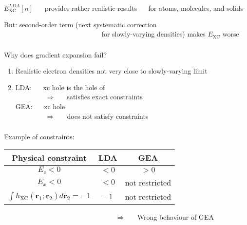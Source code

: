 \documentclass[compress]{beamer}
\begin{document}
\frame
{ 
  \frametitle{}
  \begin{small}
    {\scriptsize
      $E_{\mathrm{XC}}^{LDA}[n]$ $\quad $ provides rather realistic results $\quad $ for atoms, molecules, and solids

      \vspace{7mm}
      But: second-order term (\alert{next systematic correction} \\
      $\qquad \qquad \qquad \qquad \qquad \qquad \qquad $ for slowly-varying densities) \alert{makes} $E_{\mathrm{XC}}$ \alert{worse}
    }
  \end{small}
}

\frame
{ 
  \frametitle{}
  \begin{small}
    {\scriptsize
      Why does gradient expansion fail?
      \begin{enumerate}
        \item Realistic electron densities not very close to slowly-varying limit
        \item LDA: $\quad $ xc hole is the hole of  \\
          $\qquad \qquad $ $\Longrightarrow $ $\quad $ satisfies exact constraints \\
          GEA: $\quad $ xc hole  \\
          $\qquad \qquad $ $\Longrightarrow $ $\quad $ does not satisfy constraints
          
      \end{enumerate}
    }
  \end{small}
}

\frame
{ 
  \frametitle{}
  \begin{small}
    {\scriptsize
      Example of constraints:
      
      \begin{center}
        \begin{tabular}{c c c}
          Physical constraint & LDA & GEA \\
          \hline
          $E_{c}<0$ & $<0$ & $>0$ \\
          $E_{x}<0$ & $<0$ & not restricted \\
          $\int h_{\mathrm{XC}}(\mathbf{r}_{1};\mathbf{r}_{2})d\mathbf{r}_{2}=-1$ & $-1$ & not restricted \\
          \hline
        \end{tabular}
      \end{center}
      
      \vspace{5mm}
      $\qquad \qquad \qquad \qquad \qquad \qquad \qquad \qquad $ $\Longrightarrow $ $\quad $ \alert{Wrong behaviour} of GEA
    }
  \end{small}
}
\end{document}
